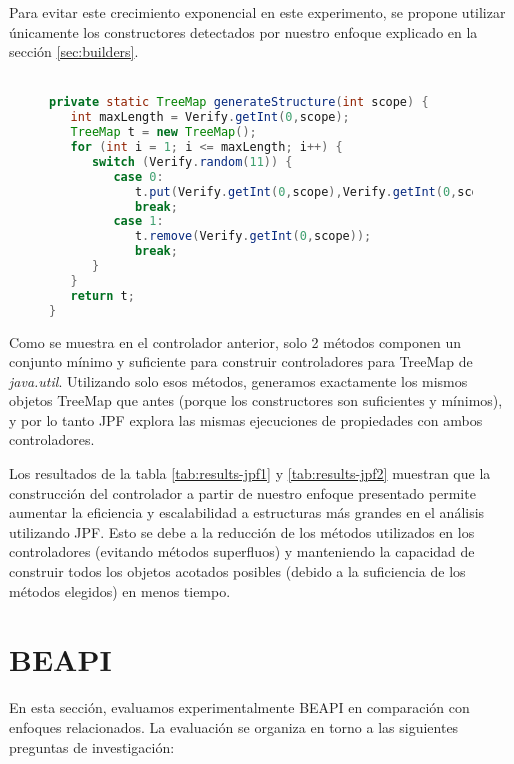
Para evitar este crecimiento exponencial en este experimento, se propone utilizar únicamente los constructores detectados por nuestro enfoque explicado en la sección \ref{sec:builders}.
\\
\\
\begin{figure}

\begin{lstlisting}[caption={Controlador con métodos constructores},label={lst:driverBLD},language=Java,captionpos=b]
private static TreeMap generateStructure(int scope) {
   int maxLength = Verify.getInt(0,scope);
   TreeMap t = new TreeMap();
   for (int i = 1; i <= maxLength; i++) {
      switch (Verify.random(11)) {
         case 0:
            t.put(Verify.getInt(0,scope),Verify.getInt(0,scope));
            break;
         case 1:
            t.remove(Verify.getInt(0,scope));
            break;						
      }
   }
   return t;
}
\end{lstlisting}
\end{figure}

Como se muestra en el controlador anterior, solo 2 métodos componen un conjunto mínimo y suficiente para construir controladores para TreeMap de \textit{java.util}. Utilizando solo esos métodos, generamos exactamente los mismos objetos TreeMap que antes (porque los constructores son suficientes y mínimos), y por lo tanto JPF explora las mismas ejecuciones de propiedades con ambos controladores.

Los resultados de la tabla \ref{tab:results-jpf1} y \ref{tab:results-jpf2} muestran que la construcción del controlador a partir de nuestro enfoque presentado permite aumentar la eficiencia y escalabilidad a estructuras más grandes en el análisis utilizando JPF. Esto se debe a la reducción de los métodos utilizados en los controladores (evitando métodos superfluos) y manteniendo la capacidad de construir todos los objetos acotados posibles (debido a la suficiencia de los métodos elegidos) en menos tiempo.





\section{BEAPI}
En esta sección, evaluamos experimentalmente \textsf{BEAPI} en comparación con enfoques relacionados. La evaluación se organiza en torno a las siguientes preguntas de investigación:

